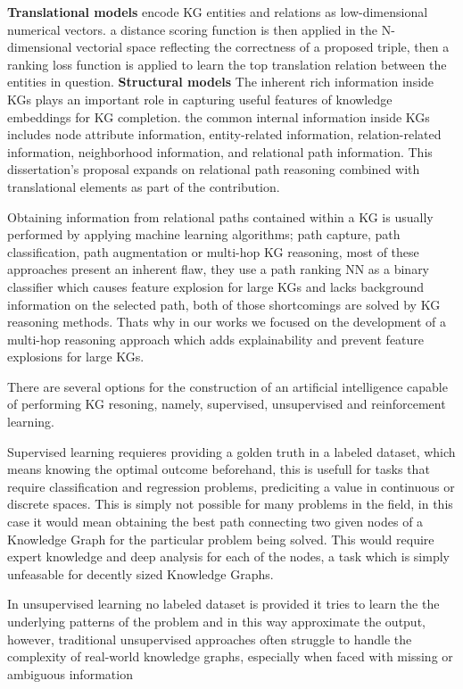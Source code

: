 \textbf{Translational models}\cite{} encode KG entities and relations as low-dimensional numerical vectors. a distance scoring function is then applied in the N-dimensional vectorial space reflecting the correctness of a proposed triple, then a ranking loss function is applied to learn the top translation relation between the entities in question.
\textbf{Structural models}\cite{} The inherent rich information inside KGs plays an important role in capturing useful features of knowledge embeddings for KG completion. the common internal information inside KGs includes node attribute information\cite{}, entity-related information\cite{}, relation-related information\cite{}, neighborhood information\cite{}, and relational path information\cite{}. This dissertation's proposal expands on relational path reasoning combined with translational elements as part of the contribution.

Obtaining information from relational paths contained within a KG is usually performed by applying machine learning algorithms; path capture\cite{}, path classification, path augmentation or multi-hop KG reasoning, most of these approaches present an inherent flaw, they use a path ranking NN as a binary classifier which causes feature explosion for large KGs and lacks background information on the selected path, both of those shortcomings are solved by KG reasoning methods. Thats why in our works we focused on the development of a multi-hop reasoning approach which adds explainability and prevent feature explosions for large KGs.

There are several options for the construction of an artificial intelligence capable of performing KG resoning, namely, supervised, unsupervised and reinforcement learning.

Supervised learning requieres providing a golden truth in a labeled dataset, which means knowing the optimal outcome beforehand, this is usefull for tasks that require classification and regression problems, prediciting a value in continuous or discrete spaces. This is simply not possible for many problems in the field, in this case it would mean obtaining the best path connecting two given nodes of a Knowledge Graph for the particular problem being solved. This would require expert knowledge and deep analysis for each of the nodes, a task which is simply unfeasable for decently sized Knowledge Graphs.

In unsupervised learning no labeled dataset is provided it tries to learn the the underlying patterns of the problem and in this way approximate the output, however, traditional unsupervised approaches often struggle to handle the complexity of real-world knowledge graphs, especially when faced with missing or ambiguous information

